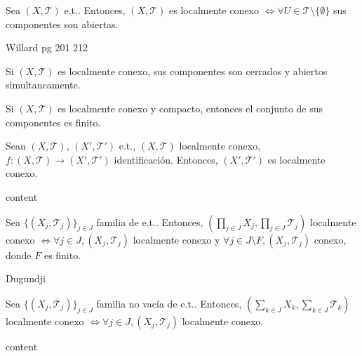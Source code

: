 \begin{prop}
  Sea $( X, \mathcal{T} )$ e.t.. Entonces, $( X, \mathcal{T} )$ es localmente conexo $\Leftrightarrow \forall U \in \mathcal{T} \setminus \{ \emptyset \}$ sus componentes son abiertas.
\end{prop}

\begin{dem}
  Willard pg 201 212
\end{dem}

\begin{obs}
  Si $( X, \mathcal{T} )$ es localmente conexo, sus componentes son cerrados y abiertos simultaneamente.
\end{obs}

\begin{obs}
  Si $( X, \mathcal{T} )$ es localmente conexo y compacto, entonces el conjunto de sus componentes es finito.
\end{obs}

\begin{prop}
  Sean $( X, \mathcal{T} )$, $( X', \mathcal{T}' )$ e.t., $( X, \mathcal{T} )$ localmente conexo, $f : ( X, \mathcal{T} ) \to ( X', \mathcal{T}' )$ identificación. Entonces, $( X', \mathcal{T}' )$ es localmente conexo.
\end{prop}

\begin{dem}
  content
\end{dem}

\begin{prop}
  Sea  $\{ ( X_{j}, \mathcal{T}_{j} ) \}_{j \in J}$ familia de e.t.. Entonces, $( \prod_{j \in J} X_{j}, \prod_{j \in J} \mathcal{T}_{j} )$ localmente conexo $\Leftrightarrow \forall j \in J, ( X_{j}, \mathcal{T}_{j} )$ localmente conexo y $\forall j \in J \setminus F, ( X_{j}, \mathcal{T}_{j} )$ conexo, donde $F$ es finito.
\end{prop}

\begin{dem}
  Dugundji
\end{dem}

\begin{prop}
  Sea $\{ ( X_{j}, \mathcal{T}_{j} ) \}_{j \in J}$ familia no vacía de e.t.. Entonces, $( \sum_{k \in J} X_{k}, \sum_{k \in J} \mathcal{T}_{k})$ localmente conexo $\Leftrightarrow \forall j \in J, ( X_{j}, \mathcal{T}_{j} )$ localmente conexo.
\end{prop}

\begin{dem}
  content
\end{dem}

